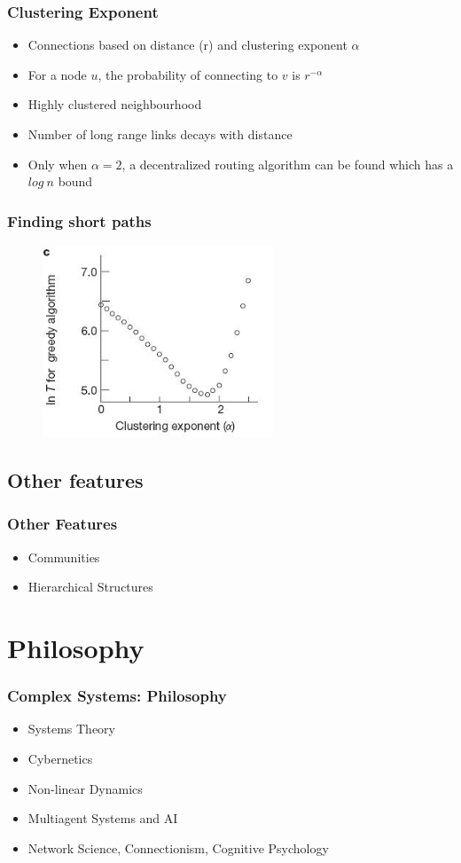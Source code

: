 \documentclass{beamer}
\begin{document}
		\frame
		{
			\frametitle{Clustering Exponent}
				\begin{itemize}
					\item<1-> {Connections based on distance (r) and clustering exponent $\alpha$}
					\item<2-> {For a node $u$, the probability of connecting to $v$ is $r^{-\alpha}$}
					\item<3-> {Highly clustered neighbourhood}
					\item<4-> {Number of long range links decays with distance}
					\item<5-> {Only when $\alpha = 2$, a decentralized routing algorithm can be found which has a $log\ n$ bound}
				\end{itemize}	
		}

		\frame
		{
			\frametitle{Finding short paths}
			\begin{centering}			
			\begin{figure}
				\includegraphics[height=2.25in]{short-paths.jpg}
			\end{figure}
			\end{centering}

		}

	\subsection{Other features}
		\frame
		{
			\frametitle{Other Features}
				\begin{itemize}
					\item<1-> {Communities}
					\item<2-> {Hierarchical Structures}
				\end{itemize}
		}

	\section{Philosophy}
	\frame
	{
		\frametitle{Complex Systems: Philosophy}
			\begin{itemize}
				\item<1-> {Systems Theory}
				\item<2-> {Cybernetics}
				\item<3-> {Non-linear Dynamics}
				\item<4-> {Multiagent Systems and AI}
				\item<5-> {Network Science, Connectionism, Cognitive Psychology}
			\end{itemize}
	}
\end{document}
